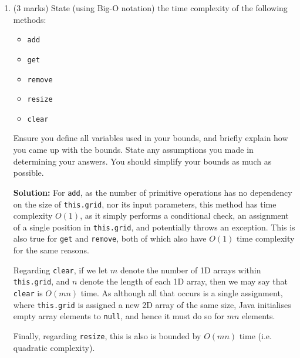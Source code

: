 \documentclass[a4,13pt]{extarticle}
\newenvironment{Solution}{\color{blue}\textbf{Solution:}}{}
\begin{document}
\begin{enumerate}
\begin{enumerate}
\begin{Solution}
Naturally, arrays offer better time complexity than List implementations, due to the allocation of contiguous memory, which allows for constant-time indexing.

However, from the perspective of memory efficiency alone, arrays offer absolutely no benefit.
	      	\end{Solution}
	      	      	      	                      
	      	\item (3 marks) State (using Big-O notation) the time complexity of the following methods:
	      	      	      	                      
	      	      \begin{itemize}
	      	      	\item \texttt{add}
	      	      	\item \texttt{get}
	      	      	\item \texttt{remove}
	      	      	\item \texttt{resize}
	      	      	\item \texttt{clear}
	      	      \end{itemize}
	      	      	      	                      
	      	      Ensure you define all variables used in your bounds, and briefly explain how you came up with the bounds. 
	      	      State any assumptions you made in determining your answers. You should simplify your bounds as much as possible.
	      	      
	      	\begin{Solution}
For \texttt{add}, as the number of primitive operations has no dependency on the size of \texttt{this.grid}, nor its input parameters, this method has time complexity $O(1)$, as it simply performs a conditional check, an assignment of a single position in \texttt{this.grid}, and potentially throws an exception. This is also true for \texttt{get} and \texttt{remove}, both of which also have $O(1)$ time complexity for the same reasons.

Regarding \texttt{clear}, if we let $m$ denote the number of 1D arrays within \texttt{this.grid}, and $n$ denote the length of each 1D array, then we may say that \texttt{clear} is $O(mn)$ time. As although all that occurs is a single assignment, where \texttt{this.grid} is assigned a new 2D array of the same size, Java initialises empty array elements to \texttt{null}, and hence it must do so for $mn$ elements.

Finally, regarding \texttt{resize}, this is also is bounded by $O(mn)$ time (i.e. quadratic complexity).


\end{Solution}
\end{enumerate}
\end{enumerate}
\end{document}
